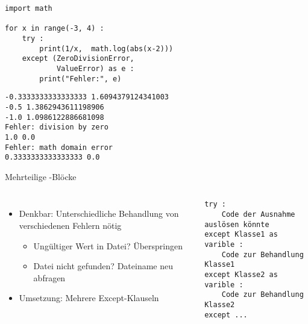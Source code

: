 
\begin{frame}[fragile]
%
\begin{tcbraster}[raster columns=2,
                  raster equal height,
                  nobeforeafter,
                  raster column skip=0.5cm]
\begin{codebox}
\begin{verbatim}
import math

for x in range(-3, 4) :
    try :
        print(1/x,  math.log(abs(x-2)))
    except (ZeroDivisionError,
            ValueError) as e :
        print("Fehler:", e)
\end{verbatim}
\end{codebox}
%
\begin{cmdbox}
\begin{verbatim}
-0.3333333333333333 1.6094379124341003
-0.5 1.3862943611198906
-1.0 1.0986122886681098
Fehler: division by zero
1.0 0.0
Fehler: math domain error
0.3333333333333333 0.0
\end{verbatim}
\end{cmdbox}
\end{tcbraster}
%
\end{frame}


\begin{frame}[fragile]{Mehrteilige -Blöcke}
%
\begin{columns}[T]
\begin{itemize}
\item Denkbar: Unterschiedliche Behandlung von verschiedenen Fehlern nötig
	\begin{itemize}
	\item Ungültiger Wert in Datei? Überspringen
	\item Datei nicht gefunden? Dateiname neu abfragen
	\end{itemize}
\item Umsetzung: Mehrere Except-Klauseln
\end{itemize}
%
\begin{codebox}
\begin{verbatim}
try :
    Code der Ausnahme auslösen könnte
except Klasse1 as varible :
    Code zur Behandlung Klasse1
except Klasse2 as varible :
    Code zur Behandlung Klasse2
except ...
\end{verbatim}
\end{codebox}
\end{columns}
%
\end{frame}

